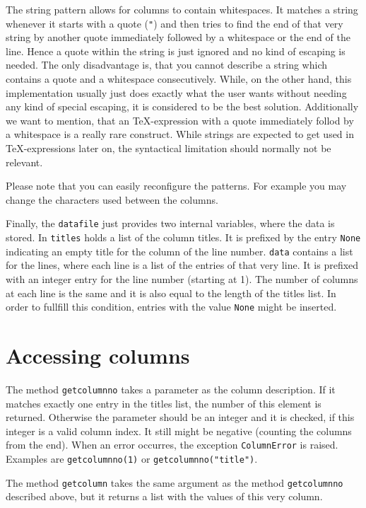 The string pattern allows for columns to contain whitespaces. It
matches a string whenever it starts with a quote (\verb|"|) and then
tries to find the end of that very string by another quote immediately
followed by a whitespace or the end of the line. Hence a quote
within the string is just ignored and no kind of escaping is needed.
The only disadvantage is, that you cannot describe a string which
contains a quote and a whitespace consecutively. While, on the
other hand, this implementation usually just does exactly what the
user wants without needing any kind of special escaping, it is
considered to be the best solution. Additionally we want to mention,
that an \TeX-expression with a quote immediately follod by a
whitespace is a really rare construct. While strings are expected to
get used in \TeX-expressions later on, the syntactical limitation
should normally not be relevant.

Please note that you can easily reconfigure the patterns. For example
you may change the characters used between the columns.

Finally, the \verb|datafile| just provides two internal variables,
where the data is stored. In \verb|titles| holds a list of the column
titles. It is prefixed by the entry \verb|None| indicating an empty
title for the column of the line number. \verb|data| contains a list
for the lines, where each line is a list of the entries of that very
line. It is prefixed with an integer entry for the line number
(starting at 1). The number of columns at each line is the same and it
is also equal to the length of the titles list. In order to fullfill
this condition, entries with the value \verb|None| might be inserted.

\section{Accessing columns}

The method \verb|getcolumnno| takes a parameter as the column
description. If it matches exactly one entry in the titles list, the
number of this element is returned. Otherwise the parameter should be
an integer and it is checked, if this integer is a valid column index.
It still might be negative (counting the columns from the end).
When an error occurres, the exception \verb|ColumnError| is raised.
Examples are \verb|getcolumnno(1)| or \verb|getcolumnno("title")|.

The method \verb|getcolumn| takes the same argument as the method
\verb|getcolumnno| described above, but it returns a list with the
values of this very column.

